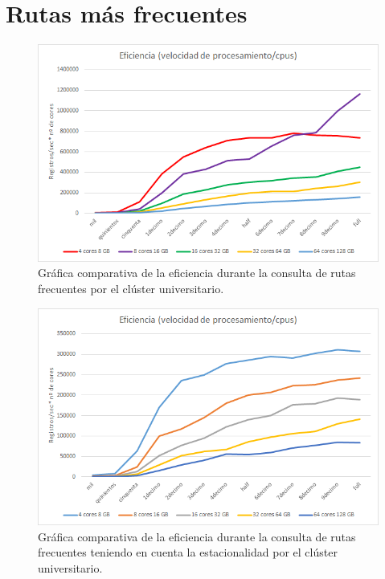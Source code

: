 \section{Rutas más frecuentes}
\begin{figure}[htp!]
	\centering
	\caption{Gráfica comparativa de la eficiencia durante la consulta de rutas frecuentes por el clúster universitario.}
	\label{gra:efiFreqUniApen}
	\vspace{5pt}
	\includegraphics[scale=0.8]{graficas/efuni}
\end{figure}
\begin{figure}[htp!]
	\centering
	\caption{Gráfica comparativa de la eficiencia durante la consulta de rutas frecuentes teniendo en cuenta la estacionalidad por el clúster universitario.}
	\label{gra:efiFreqDayUniApen}
	\vspace{5pt}
	\includegraphics[scale=0.8]{graficas/efduni}
\end{figure}
